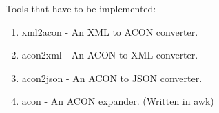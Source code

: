 \documentclass[listof=totoc]{article}
\begin{document}
\noindent Tools that have to be implemented:
\begin{enumerate}
  \item xml2acon - An XML to ACON converter.
  \item acon2xml - An ACON to XML converter.
  \item acon2json - An ACON to JSON converter.
  \item acon - An ACON expander. (Written in awk)
\end{enumerate}


\lstlistoflistings



\end{document}
